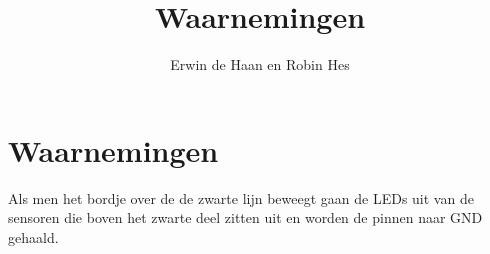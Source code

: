 \documentclass[11pt]{article} %
\title{Waarnemingen}
\author{Erwin de Haan en Robin Hes}
\begin{document}
\maketitle

\section{Waarnemingen}

Als men het bordje over de de zwarte lijn beweegt gaan de LEDs uit van de sensoren die boven het zwarte deel zitten uit en worden de pinnen naar GND gehaald.
\end{document}
